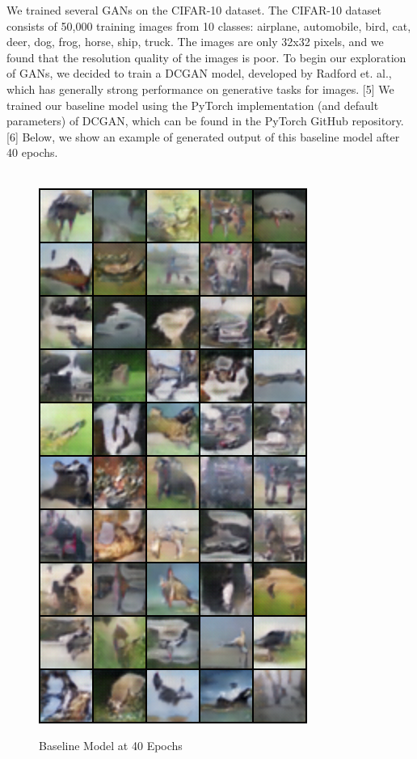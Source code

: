 \documentclass[a4paper]{article}
\begin{document}
We trained several GANs on the CIFAR-10 dataset. The CIFAR-10 dataset consists of 50,000 training images from 10 classes: airplane, automobile, bird, cat, deer, dog, frog, horse, ship, truck. The images are only 32x32 pixels, and we found that the resolution quality of the images is poor. To begin our exploration of GANs, we decided to train a DCGAN model, developed by Radford et. al., which has generally strong performance on generative tasks for images. [5] We trained our baseline model using the PyTorch implementation (and default parameters) of DCGAN, which can be found in the PyTorch GitHub repository. [6] Below, we show an example of generated output of this baseline model after 40 epochs.
\\
\\
\begin{figure}[H]
  \includegraphics[scale=0.5]{images/baseline_normalized_10x5_generated.png}
  \label{fig:boat1}
  \caption{Baseline Model at 40 Epochs}
\end{figure}
\end{document}
